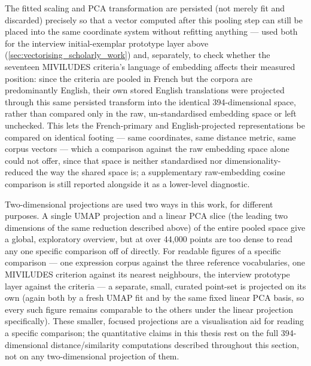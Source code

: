 The fitted scaling and PCA transformation are persisted (not merely fit and discarded) precisely so that a vector computed after this pooling step can still be placed into the same coordinate system without refitting anything — used both for the interview initial-exemplar prototype layer above (\ref{sec:vectorising_scholarly_work}) and, separately, to check whether the seventeen MIVILUDES criteria's language of embedding affects their measured position: since the criteria are pooled in French but the corpora are predominantly English, their own stored English translations were projected through this same persisted transform into the identical 394-dimensional space, rather than compared only in the raw, un-standardised embedding space or left unchecked. This lets the French-primary and English-projected representations be compared on identical footing — same coordinates, same distance metric, same corpus vectors — which a comparison against the raw embedding space alone could not offer, since that space is neither standardised nor dimensionality-reduced the way the shared space is; a supplementary raw-embedding cosine comparison is still reported alongside it as a lower-level diagnostic.

Two-dimensional projections are used two ways in this work, for different purposes. A single UMAP \autocite{mcinnesUMAPUniformManifold2020} projection and a linear PCA slice (the leading two dimensions of the same reduction described above) of the entire pooled space give a global, exploratory overview, but at over 44,000 points are too dense to read any one specific comparison off of directly. For readable figures of a specific comparison — one expression corpus against the three reference vocabularies, one MIVILUDES criterion against its nearest neighbours, the interview prototype layer against the criteria — a separate, small, curated point-set is projected on its own (again both by a fresh UMAP fit and by the same fixed linear PCA basis, so every such figure remains comparable to the others under the linear projection specifically). These smaller, focused projections are a visualisation aid for reading a specific comparison; the quantitative claims in this thesis rest on the full 394-dimensional distance/similarity computations described throughout this section, not on any two-dimensional projection of them.


